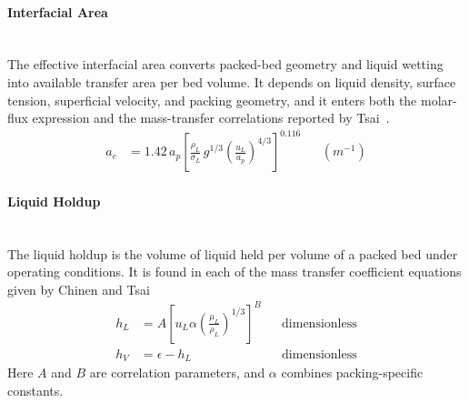                 \paragraph{Interfacial Area}\mbox{}\\[0.5em]
                The effective interfacial area converts packed-bed geometry and liquid wetting into available transfer area per bed volume. It depends on liquid density, surface tension, superficial velocity, and packing geometry, and it enters both the molar-flux expression and the mass-transfer correlations reported by Tsai~\cite{Tsai2010}.
                \begin{align}
                    a_e
                    &= 1.42\,a_p\left[\frac{\rho_L}{\sigma_L}\,g^{1/3}\left(\frac{u_L}{a_p}\right)^{4/3}\right]^{0.116} && \left(\unit{m^{-1}}\right)
                \end{align}

                \paragraph{Liquid Holdup}\mbox{}\\[0.5em]
                The liquid holdup is the volume of liquid held per volume of a packed bed under operating conditions. It is found in each of the mass transfer coefficient equations given by Chinen and Tsai~\cite{Chinen2018,Tsai2010}
                \begin{align}
                    h_L &= A\left[u_L \alpha\left(\frac{\mu_L}{\rho_L}\right)^{1 / 3}\right]^{B} && \text{dimensionless}\\
                    h_V &= \epsilon - h_L && \text{dimensionless}
                \end{align}
                Here $A$ and $B$ are correlation parameters, and $\alpha$ combines packing-specific constants.

